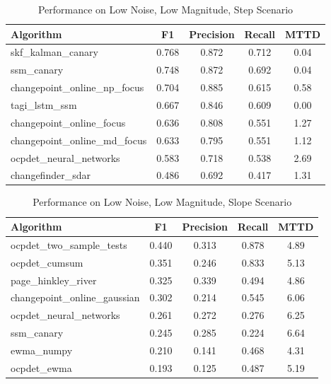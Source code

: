 \documentclass[journal,article,submit,pdftex,moreauthors]{Definitions/mdpi}
\begin{document}
\begin{table}[H]
\centering
\caption{Performance on Low Noise, Low Magnitude, Step Scenario}
\label{tab:scenario_bajo_bajo_escalon}
\small
\begin{tabular}{lcccc}
\toprule
\textbf{Algorithm} & \textbf{F1} & \textbf{Precision} & \textbf{Recall} & \textbf{MTTD} \\
\midrule
skf\_kalman\_canary & 0.768 & 0.872 & 0.712 & 0.04 \\
ssm\_canary & 0.748 & 0.872 & 0.692 & 0.04 \\
changepoint\_online\_np\_focus & 0.704 & 0.885 & 0.615 & 0.58 \\
tagi\_lstm\_ssm & 0.667 & 0.846 & 0.609 & 0.00 \\
changepoint\_online\_focus & 0.636 & 0.808 & 0.551 & 1.27 \\
changepoint\_online\_md\_focus & 0.633 & 0.795 & 0.551 & 1.12 \\
ocpdet\_neural\_networks & 0.583 & 0.718 & 0.538 & 2.69 \\
changefinder\_sdar & 0.486 & 0.692 & 0.417 & 1.31 \\
\bottomrule
\end{tabular}
\end{table}

\begin{table}[H]
\centering
\caption{Performance on Low Noise, Low Magnitude, Slope Scenario}
\label{tab:scenario_bajo_bajo_pendiente}
\small
\begin{tabular}{lcccc}
\toprule
\textbf{Algorithm} & \textbf{F1} & \textbf{Precision} & \textbf{Recall} & \textbf{MTTD} \\
\midrule
ocpdet\_two\_sample\_tests & 0.440 & 0.313 & 0.878 & 4.89 \\
ocpdet\_cumsum & 0.351 & 0.246 & 0.833 & 5.13 \\
page\_hinkley\_river & 0.325 & 0.339 & 0.494 & 4.86 \\
changepoint\_online\_gaussian & 0.302 & 0.214 & 0.545 & 6.06 \\
ocpdet\_neural\_networks & 0.261 & 0.272 & 0.276 & 6.25 \\
ssm\_canary & 0.245 & 0.285 & 0.224 & 6.64 \\
ewma\_numpy & 0.210 & 0.141 & 0.468 & 4.31 \\
ocpdet\_ewma & 0.193 & 0.125 & 0.487 & 5.19 \\
\bottomrule
\end{tabular}
\end{table}
\end{document}
